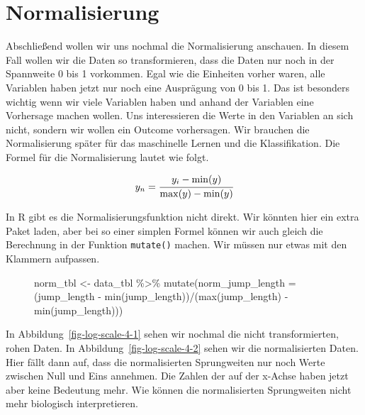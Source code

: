 \documentclass[
  letterpaper,
]{scrbook}
\newenvironment{Shaded}{\begin{snugshade}}{\end{snugshade}}
\newcommand{\AttributeTok}[1]{\textcolor[rgb]{0.40,0.45,0.13}{#1}}
\newcommand{\FunctionTok}[1]{\textcolor[rgb]{0.28,0.35,0.67}{#1}}
\newcommand{\NormalTok}[1]{\textcolor[rgb]{0.00,0.23,0.31}{#1}}
\newcommand{\OtherTok}[1]{\textcolor[rgb]{0.00,0.23,0.31}{#1}}
\newcommand{\SpecialCharTok}[1]{\textcolor[rgb]{0.37,0.37,0.37}{#1}}
\begin{document}
\hypertarget{normalisierung}{%
\section{Normalisierung}\label{normalisierung}}

Abschließend wollen wir uns nochmal die Normalisierung anschauen. In
diesem Fall wollen wir die Daten so transformieren, dass die Daten nur
noch in der Spannweite 0 bis 1 vorkommen. Egal wie die Einheiten vorher
waren, alle Variablen haben jetzt nur noch eine Ausprägung von 0 bis 1.
Das ist besonders wichtig wenn wir viele Variablen haben und anhand der
Variablen eine Vorhersage machen wollen. Uns interessieren die Werte in
den Variablen an sich nicht, sondern wir wollen ein Outcome vorhersagen.
Wir brauchen die Normalisierung später für das maschinelle Lernen und
die Klassifikation. Die Formel für die Normalisierung lautet wie folgt.

\[
y_n = \cfrac{y_i - \min(y)}{\max(y) - \min(y)} 
\]

In R gibt es die Normalisierungsfunktion nicht direkt. Wir könnten hier
ein extra Paket laden, aber bei so einer simplen Formel können wir auch
gleich die Berechnung in der Funktion \texttt{mutate()} machen. Wir
müssen nur etwas mit den Klammern aufpassen.

\begin{figure}

\begin{Shaded}
\begin{Highlighting}[]
\NormalTok{norm\_tbl }\OtherTok{\textless{}{-}}\NormalTok{ data\_tbl }\SpecialCharTok{\%\textgreater{}\%} 
  \FunctionTok{mutate}\NormalTok{(}\AttributeTok{norm\_jump\_length =}\NormalTok{ (jump\_length }\SpecialCharTok{{-}} \FunctionTok{min}\NormalTok{(jump\_length))}\SpecialCharTok{/}\NormalTok{(}\FunctionTok{max}\NormalTok{(jump\_length) }\SpecialCharTok{{-}} \FunctionTok{min}\NormalTok{(jump\_length)))}
\end{Highlighting}
\end{Shaded}

\end{figure}

In Abbildung~\ref{fig-log-scale-4-1} sehen wir nochmal die nicht
transformierten, rohen Daten. In Abbildung~\ref{fig-log-scale-4-2} sehen
wir die normalisierten Daten. Hier fällt dann auf, dass die
normalisierten Sprungweiten nur noch Werte zwischen Null und Eins
annehmen. Die Zahlen der auf der x-Achse haben jetzt aber keine
Bedeutung mehr. Wie können die normalisierten Sprungweiten nicht mehr
biologisch interpretieren.
\end{document}
